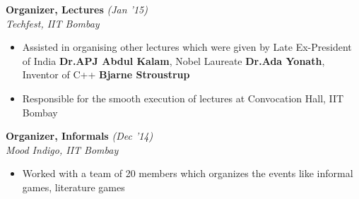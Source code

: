 \documentclass[10.99pt]{article}
\begin{document}
\textbf{Organizer, Lectures} \hfill{\sl \small (Jan '15)}\\%
{\it Techfest, IIT Bombay}\\
\vspace{-17pt}
\begin{itemize}[itemsep = -0.75 mm, leftmargin=*]
\item Assisted in organising other lectures which were given by Late Ex-President of India {\bf Dr.APJ Abdul Kalam}, Nobel Laureate  {\bf Dr.Ada Yonath}, Inventor of C++ {\bf Bjarne Stroustrup}
\item Responsible for the smooth execution of lectures at Convocation Hall, IIT Bombay
\end{itemize}
\textbf{Organizer, Informals} \hfill{\sl \small (Dec '14)}\\%
{\it Mood Indigo, IIT Bombay}\\
\vspace{-17pt}
\begin{itemize}[itemsep = -0.75 mm, leftmargin=*]
\item Worked with a team of 20 members which organizes the events like informal games, literature games
\end{itemize}
\vspace{-10pt}
\end{document}
